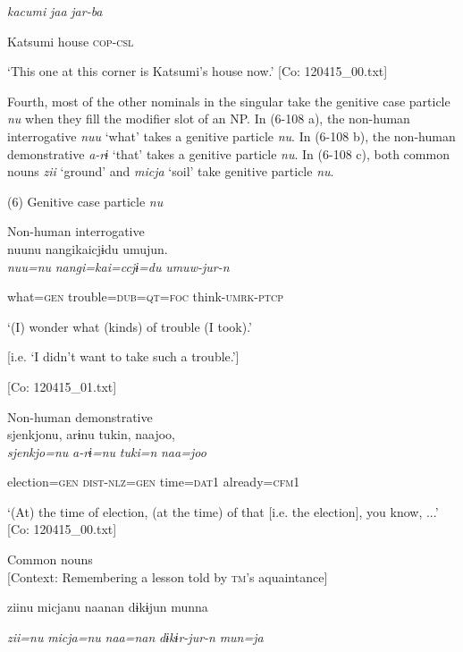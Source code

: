       \textit{kacumi}  \textit{jaa}  \textit{jar-ba}

      Katsumi  house  \textsc{cop}-\textsc{csl}

\glt ‘This one at this corner is Katsumi’s house now.’ [Co: 120415\_00.txt]
\z

  Fourth, most of the other nominals in the singular take the genitive case particle \textit{nu} when they fill the modifier slot of an NP. In (6-108 a), the non-human interrogative \textit{nuu} ‘what’ takes a genitive particle \textit{nu}. In (6-108 b), the non-human demonstrative \textit{a-rɨ} ‘that’ takes a genitive particle \textit{nu}. In (6-108 c), both common nouns \textit{zii} ‘ground’ and \textit{micja} ‘soil’ take genitive particle \textit{nu}.

(6)  Genitive case particle \textit{nu}

 \ea Non-human interrogative\\
{\TM}
\gll  nuunu  nangikaicjɨdu  umujun.\\

      \textit{nuu=nu}  \textit{nangi=kai=ccjɨ=du}  \textit{umuw-jur-n}

      what=\textsc{gen}  trouble=\textsc{dub}=\textsc{qt}=\textsc{foc}  think-\textsc{umrk}-\textsc{ptcp}

\glt ‘(I) wonder what (kinds) of trouble (I took).’

[i.e. ‘I didn’t want to take such a trouble.’]

      [Co: 120415\_01.txt]
\z

 \ex Non-human demonstrative\\
{\TM}
\gll  {\textbar}sjenkjo{\textbar}nu,  arɨnu  tukin,  naajoo,\\

      \textit{sjenkjo=nu}  \textit{a-rɨ=nu}  \textit{tuki=n}  \textit{naa=joo}

      election=\textsc{gen}  \textsc{dist}-\textsc{nlz}=\textsc{gen}  time=\textsc{dat}1  already=\textsc{cfm}1

\glt ‘(At) the time of election, (at the time) of that [i.e. the election], you know, ...’ [Co: 120415\_00.txt]
\z

 \ex Common nouns\\{}
[Context: Remembering a lesson told by \textsc{tm}’s aquaintance]

{\TM}
\gll ziinu  micjanu  naanan  dɨkɨjun  munna

      \textit{zii=nu}  \textit{micja=nu}  \textit{naa=nan}  \textit{dɨkɨr-jur-n}  \textit{mun=ja}

